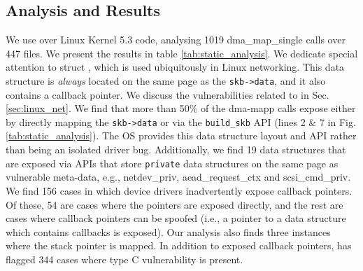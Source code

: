 \subsection{Analysis and Results}
We use \tool over Linux Kernel 5.3 code,
analysing 1019 dma\_map\_single calls over 447 files. We present the results in table \ref{tab:static_analysis}. We dedicate special attention to struct \shinfo, which is used ubiquitously in Linux networking. This data structure is \textit{always} located on the same page as the \texttt{skb->data}, and it also contains a callback pointer. We discuss the vulnerabilities related to \shinfo in Sec. \ref{sec:linux_net}. We find that more than 50\% of the dma-mapp calls expose \shinfo either by directly mapping the \texttt{skb->data} or via the \texttt{build\_skb} API (lines 2 \& 7 in Fig. \ref{tab:static_analysis}). The OS provides this data structure layout and API rather than being an isolated driver bug. Additionally, we find 19 data structures that are exposed via APIs that store \texttt{private} data structures on the same page as vulnerable meta-data, e.g., netdev\_priv, aead\_request\_ctx and scsi\_cmd\_priv. We find 156 cases in which device drivers inadvertently expose callback pointers. Of these, 54 are cases where the pointers are exposed directly, and the rest are cases where callback pointers can be spoofed (i.e., a pointer to a data structure which contains callbacks is exposed). Our analysis also finds three instances where the stack pointer is mapped. In addition to exposed callback pointers, \tool has flagged 344 cases where type C vulnerability is present. 

\begin{table}[]
\centering
{}
\vspace{1mm}
\caption{\tool result summary.}
\label{tab:static_analysis}
\end{table}


